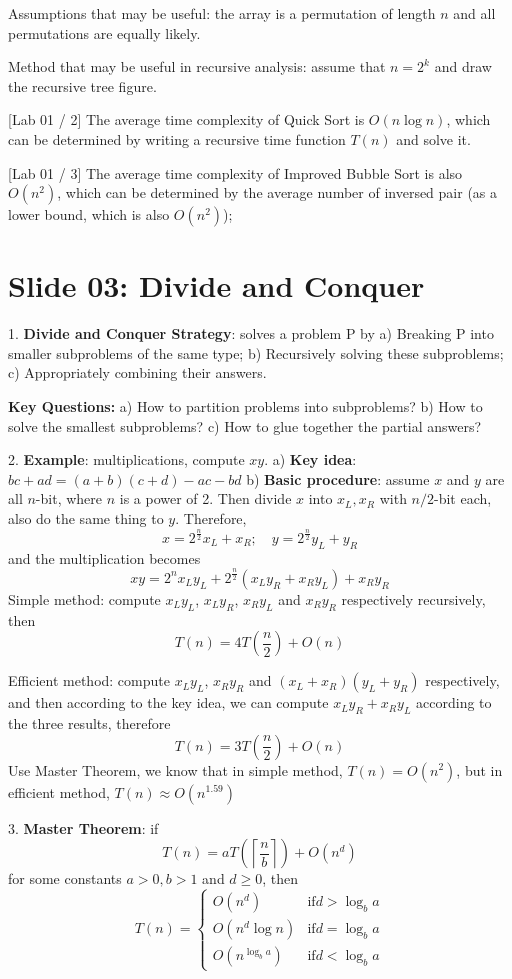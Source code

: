 \documentclass[10pt,a4paper]{article}
\begin{document}
Assumptions that may be useful: the array is a permutation of length \(n\) and all permutations are equally likely.

Method that may be useful in recursive analysis: assume that \(n = 2^k\) and draw the recursive tree figure.

[Lab 01 / 2] The average time complexity of Quick Sort is \(O(n\log n)\), which can be determined by writing a recursive time function \(T(n)\) and solve it.

[Lab 01 / 3] The average time complexity of Improved Bubble Sort is also \(O(n^2)\), which can be determined by the average number of inversed pair (as a lower bound, which is also \(O(n^2)\));

\section*{Slide 03: Divide and Conquer}

1. \textbf{Divide and Conquer Strategy}: solves a problem P by
a) Breaking P into smaller subproblems of the same type;
b) Recursively solving these subproblems;
c) Appropriately combining their answers.

\textbf{Key Questions:}
a) How to partition problems into subproblems?
b) How to solve the smallest subproblems?
c) How to glue together the partial answers?

2. \textbf{Example}: multiplications, compute \(xy\).
a) \textbf{Key idea}: \(bc + ad = (a + b)(c + d) - ac - bd\)
b) \textbf{Basic procedure}: assume \(x\) and \(y\) are all \(n\)-bit, where \(n\) is a power of 2. Then divide \(x\) into \(x_L, x_R\) with \(n/2\)-bit each, also do the same thing to \(y\). Therefore,
\[
x = 2^{\frac{n}{2}}x_L + x_R; \quad y = 2^{\frac{n}{2}}y_L + y_R
\]
and the multiplication becomes
\[
xy = 2^n x_L y_L + 2^{\frac{n}{2}}(x_L y_R + x_R y_L) + x_R y_R
\]
Simple method: compute \(x_L y_L\), \(x_L y_R\), \(x_R y_L\) and \(x_R y_R\) respectively recursively, then
\[
T(n) = 4T\left(\frac{n}{2}\right) + O(n)
\]

Efficient method: compute \(x_L y_L\), \(x_R y_R\) and \((x_L + x_R)(y_L + y_R)\) respectively, and then according to the key idea, we can compute \(x_L y_R + x_R y_L\) according to the three results, therefore
\[
T(n) = 3T\left(\frac{n}{2}\right) + O(n)
\]
Use Master Theorem, we know that in simple method, \(T(n) = O(n^2)\), but in efficient method, \(T(n) \approx O(n^{1.59})\)

3. \textbf{Master Theorem}: if
\[
T(n) = aT\left(\left\lceil \frac{n}{b} \right\rceil\right) + O(n^d)
\]
for some constants \(a > 0, b > 1\) and \(d \geq 0\), then
\[
T(n) = \begin{cases}
O(n^d) & \mathrm{if } d > \log_b a \\
O(n^d \log n) & \mathrm{if } d = \log_b a \\
O(n^{\log_b a}) & \mathrm{if } d < \log_b a
\end{cases}
\]
\end{document}
